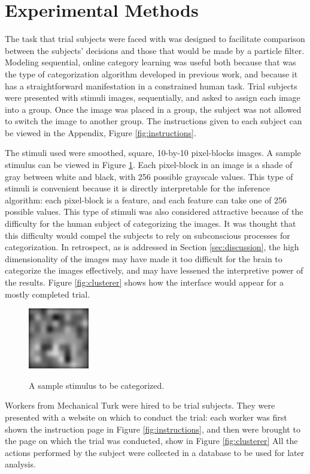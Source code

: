 \section*{Experimental Methods}
The task that trial subjects were faced with was designed to facilitate
comparison between the subjects' decisions and those that would be made by a
particle filter. Modeling sequential, online category learning was useful both
because that was the type of categorization algorithm developed in previous
work, and because it has a straightforward manifestation in a constrained human
task. Trial subjects were presented with stimuli images, sequentially, and asked
to assign each image into a group. Once the image was placed in a group, the
subject was not allowed to switch the image to another group. The instructions
given to each subject can be viewed in the Appendix, Figure
\ref{fig:instructions}.

The stimuli used were smoothed, square, 10-by-10 pixel-blocks images. A sample
stimulus can be viewed in Figure \ref{fig:stimulus}. Each pixel-block in an
image is a shade of gray between white and black, with 256 possible grayscale
values. This type of stimuli is convenient because it is directly interpretable
for the inference algorithm: each pixel-block is a feature, and each feature can
take one of 256 possible values. This type of stimuli was also considered
attractive because of the difficulty for the human subject of categorizing the
images. It was thought that this difficulty would compel the subjects to rely on
subconscious processes for categorization. In retrospect, as is addressed in
Section \ref{sec:discussion}, the high dimensionality of the images may have
made it too difficult for the brain to categorize the images effectively, and
may have lessened the interpretive power of the results. Figure
\ref{fig:clusterer} shows how the interface would appear for a mostly completed trial.

\begin{figure}
\centering
\includegraphics[scale=1]{img/stimulus.png}
\label{fig:stimulus}
\caption{A sample stimulus to be categorized.}
\end{figure}

Workers from Mechanical Turk were hired to be trial subjects. They were presented
with a website on which to conduct the trial: each worker was first shown the
instruction page in Figure \ref{fig:instructions}, and then were brought to the
page on which the trial was conducted, show in Figure \ref{fig:clusterer}  All
the actions performed by the subject were collected in a database to be used for
later analysis.

